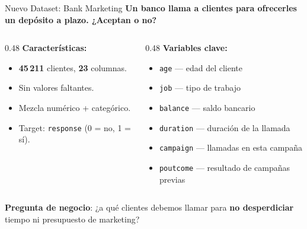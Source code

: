 \documentclass[aspectratio=169, 11pt]{beamer}
\begin{document}
\begin{frame}[shrink=5]{Nuevo Dataset: Bank Marketing}
  \vspace{-4pt}
  {\footnotesize\color{arcaDark}\bfseries
    Un banco llama a clientes para ofrecerles un depósito a plazo.
    ¿Aceptan o no?}

  \vspace{6pt}
  \begin{columns}[T]
    \begin{column}{0.48\textwidth}
      {\footnotesize\bfseries\color{arcaDark} Características:}
      \vspace{4pt}

      {\scriptsize
      \begin{itemize}\setlength{\itemsep}{3pt}
        \item[{\color{codeGreen}\faCheckCircle}]
          \textbf{45\,211} clientes, \textbf{23} columnas.
        \item[{\color{codeGreen}\faCheckCircle}]
          Sin valores faltantes.
        \item[{\color{codeGreen}\faCheckCircle}]
          Mezcla numérico + categórico.
        \item[{\color{codeGreen}\faCheckCircle}]
          Target: \texttt{response} (0 = no, 1 = sí).
      \end{itemize}
      }
    \end{column}

    \begin{column}{0.48\textwidth}
      {\footnotesize\bfseries\color{arcaDark} Variables clave:}
      \vspace{4pt}

      {\scriptsize
      \begin{itemize}\setlength{\itemsep}{3pt}
        \item \texttt{age} --- edad del cliente
        \item \texttt{job} --- tipo de trabajo
        \item \texttt{balance} --- saldo bancario
        \item \texttt{duration} --- duración de la llamada
        \item \texttt{campaign} --- llamadas en esta campaña
        \item \texttt{poutcome} --- resultado de campañas previas
      \end{itemize}
      }
    \end{column}
  \end{columns}

  \vspace{6pt}
  {\footnotesize\color{arcaDark}
    \faLightbulb\hspace{4pt}
    \textbf{Pregunta de negocio}: ¿a qué clientes debemos llamar para
    \textbf{no desperdiciar} tiempo ni presupuesto de marketing?}
\end{frame}
\end{document}
